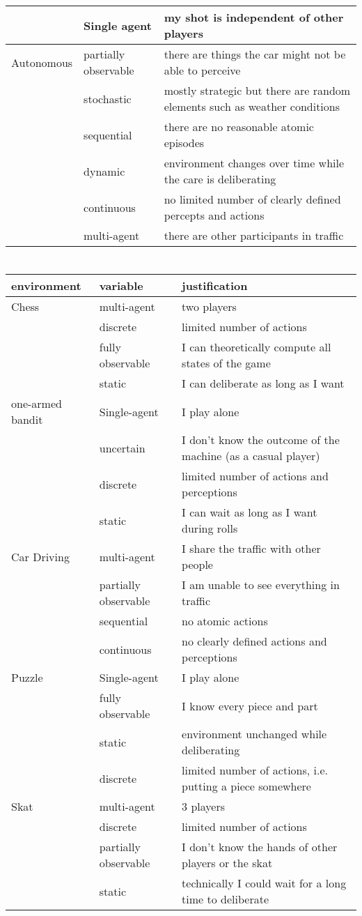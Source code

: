 \documentclass[a4paper,12pt]{scrartcl}
\newcounter{n}
\begin{document}
\begin{tabular}{l || l | l }
		& Single agent & my shot is independent of other players \\ \hline
		Autonomous  & partially observable & there are things the car might not be able to perceive \\
		& stochastic &  mostly strategic but there are random elements such as weather conditions\\
		& sequential & there are no reasonable atomic episodes \\
		& dynamic & environment changes over time while the care is deliberating \\
		& continuous & no limited number of clearly defined percepts and actions \\
		& multi-agent & there are other participants in traffic 
	\end{tabular}
\section{}
	\begin{tabular}{l || l | l }
		environment & variable & justification \\ \hline 
		Chess & multi-agent & two players \\
		& discrete & limited number of actions \\
		& fully observable & I can theoretically compute all states of the game \\
		& static & I can deliberate as long as I want \\ \hline
		one-armed bandit & Single-agent & I play alone \\
		& uncertain & I don't know the outcome of the machine (as a casual player) \\
		& discrete & limited number of actions and perceptions \\
		& static & I can wait as long as I want during rolls \\ \hline
		Car Driving & multi-agent & I share the traffic with other people \\
		& partially observable & I am unable to see everything in traffic \\
		& sequential & no atomic actions \\
		& continuous & no clearly defined actions and perceptions \\ \hline
		Puzzle & Single-agent & I play alone \\
		& fully observable & I know every piece and part  \\
		& static & environment unchanged while deliberating \\
		& discrete & limited number of actions, i.e. putting a piece somewhere \\ \hline 
		Skat & multi-agent & 3 players \\
		& discrete & limited number of actions  \\
		& partially observable & I don't know the hands of other players or the skat \\
		& static & technically I could wait for a long time to deliberate \\ \hline 
	\end{tabular}
\section{}
	
	 
\end{document}
